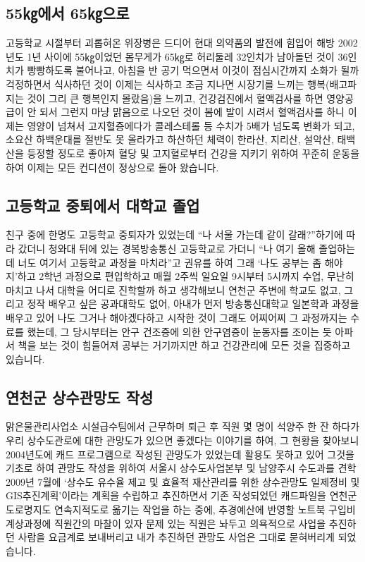 \documentclass[chapter,book,openany,twoside]{oblivoir}
\begin{document}
\subsection{55㎏에서 65㎏으로}
고등학교 시절부터 괴롭혀온 위장병은 드디어 현대 의약품의 발전에 힘입어 해방 2002년도 1년 사이에 55㎏이었던 몸무게가 65㎏로 허리둘레 32인치가 남아돌던 것이 36인치가 빵빵하도록 불어나고, 아침을 반 공기 먹으면서 이것이 점심시간까지 소화가 될까 걱정하면서 식사하던 것이 이제는 식사하고 조금 지나면 시장기를 느끼는 행복(배고파지는 것이 그리 큰 행복인지 몰랐음)을 느끼고, 건강검진에서 혈액검사를 하면 영양공급이 안 되서 그런지 마냥 맑음으로 나오던 것이 봄에 발이 시려서 혈액검사를 하니 이제는 영양이 넘쳐서 고지혈증에다가 콜레스테롤 등 수치가 5배가 넘도록 변화가 되고, 소요산 하백운대를 절반도 못 올라가고 하산하던 체력이 한라산, 지리산, 설악산, 태백산을 등정할 정도로 좋아져 혈당 및 고지혈로부터 건강을 지키기 위하여 꾸준히 운동을 하여 이제는 모든 컨디션이 정상으로 돌아 왔습니다.

\subsection{고등학교 중퇴에서 대학교 졸업}

친구 중에 한명도 고등학교 중퇴자가 있었는데 ``나 서울 가는데 같이 갈래?''하기에 따라 갔더니 청와대 뒤에 있는 경복방송통신 고등학교로 가더니 ``나 여기 올해 졸업하는데 너도 여기서 고등학교 과정을 마치라''고 권유를 하여 그래 `나도 공부는 좀 해야지'하고 2학년 과정으로 편입학하고 매월 2주씩 일요일 9시부터 5시까지 수업, 무난히 마치고 나서 대학을 어디로 진학할까 하고 생각해보니 연천군 주변에 학교도 없고, 그리고 정작 배우고 싶은 공과대학도 없어, 아내가 먼저 방송통신대학교 일본학과 과정을 배우고 있어 나도 그거나 해야겠다하고 시작한 것이 그래도 어찌어찌 그 과정까지는 수료를 했는데, 그 당시부터는 안구 건조증에 의한 안구염증이 눈동자를 조이는 듯 아파서 책을 보는 것이 힘들어져 공부는 거기까지만 하고 건강관리에 모든 것을 집중하고 있습니다.

\subsection{연천군 상수관망도 작성}

맑은물관리사업소 시설급수팀에서 근무하며 퇴근 후 직원 몇 명이 석양주 한 잔 하다가 우리 상수도관로에 대한 관망도가 있으면 좋겠다는 이야기를 하여, 그 현황을 찾아보니 2004년도에 캐드 프로그램으로 작성된 관망도가 있었는데 활용도 못하고 있어 그것을 기초로 하여 관망도 작성을 위하여 서울시 상수도사업본부 및 남양주시 수도과를 견학 2009년 7월에 `상수도 유수율 제고 및 효율적 재산관리를 위한 상수관망도 일제정비 및 GIS추진계획'이라는 계획을 수립하고 추진하면서 기존 작성되었던 캐드파일을 연천군 도로명지도 연속지적도로 옮기는 작업을 하는 중에, 추경예산에 반영할 노트북 구입비계상과정에 직원간의 마찰이 있자 문제 있는 직원은 놔두고 의욕적으로 사업을 추진하던 사람을 요금계로 보내버리고 내가 추진하던 관망도 사업은 그대로 묻혀버리게 되었습니다.
\end{document}
